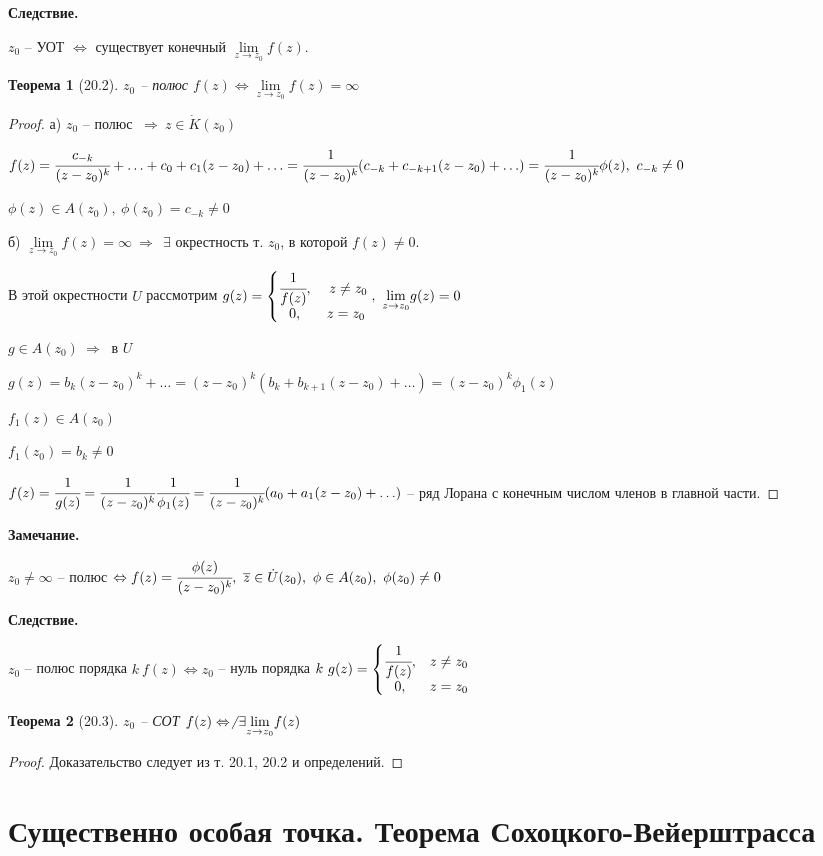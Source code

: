 \documentclass[final]{report}
\renewcommand{\bf}{\bfseries}
\newcommand{\then}{\ \Rightarrow\ }
\newcommand{\mlim}[1]{\underset{#1}{\lim}}
\newcommand{\LRA}{\Leftrightarrow}
\renewcommand{\bar}{\overline}
\renewcommand{\f}{\phi}
\newcommand{\E}{\ \exists}
\newcommand{\z}{\bar{z}}
\newcommand{\sys}[1]{\left\{\begin{matrix}#1\end{matrix}\right.}
\newtheorem*{theor}{Теорема}
\theoremstyle{remark}
\begin{document}
{\bf Следствие.}

$z_0$ -- УОТ $\LRA$ существует конечный $\mlim{z\to z_0}f(z)$.

\begin{theor}[20.2]
$z_0$ -- полюс $f(z)\LRA\mlim{z\to z_0}f(z)=\infty$
\end{theor}
\begin{proof}
а) $z_0$ -- полюс $\then z\in\dot{K}(z_0)$

$f(z)=\cfrac{c_{-k}}{(z-z_0)^k}+\ldots+c_0+c_1(z-z_0)+\ldots=\cfrac{1}{(z-z_0)^k}(c_{-k}+c_{-k+1}(z-z_0)+\ldots)=\cfrac{1}{(z-z_0)^k}\f(z),\ c_{-k}\neq 0$

$\f(z)\in A(z_0),\ \f(z_0)=c_{-k}\neq0$

б) $\mlim{z\to z_0}f(z)=\infty\then \E$ окрестность т. $z_0$, в которой $f(z)\neq0$.

В этой окрестности $U$ рассмотрим $g(z)=\sys{\cfrac1{f(z)},&\ z\neq z_0 \\ 0, &z=z_0},\ \mlim{z\to z_0} g(z)=0$

$g\in A(z_0)\then$ в $U$

$g(z)=b_k(z-z_0)^k+\ldots=(z-z_0)^k(b_k+b_{k+1}(z-z_0)+\ldots)=(z-z_0)^k\f_1(z)$

$f_1(z)\in A(z_0)$

$f_1(z_0)=b_k\neq 0$

$f(z)=\cfrac{1}{g(z)}=\cfrac1{(z-z_0)^k}\cfrac1{\f_1(z)}=\cfrac1{(z-z_0)^k}(a_0+a_1(z-z_0)+\ldots)$ -- ряд Лорана с конечным числом членов в главной части.
\end{proof}

{\bf Замечание.}

$z_0\neq \infty$ -- полюс $\LRA f(z)=\cfrac{\f(z)}{(z-z_0)^k},\ \z\in \dot{U}(z_0),\ \f\in A(z_0),\ \f(z_0)\neq 0$

{\bf Следствие.}

$z_0$ -- полюс порядка $k\ f(z) \LRA z_0$ -- нуль порядка $k\ g(z)=\sys{\cfrac1{f(z)},&z\neq z_0 \\ 0, &z=z_0}$

\begin{theor}[20.3]
$z_0$ -- СОТ $f(z) \LRA \not\E\mlim{z\to z_0}f(z)$
\end{theor}
\begin{proof}
Доказательство следует из т. 20.1, 20.2 и определений.
\end{proof}

\newpage

\section{Существенно особая точка. Теорема Сохоцкого-Вейерштрасса}
\end{document}
